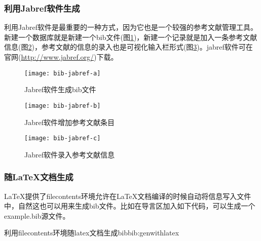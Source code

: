 \documentclass[twoside]{article} %
\begin{document}
\subsubsection{利用Jabref软件生成}
利用Jabref软件是最重要的一种方式，因为它也是一个较强的参考文献管理工具。新建一个数据库就是新建一个bib文件(图\ref{bib:jabref-a})，新建一个记录就是加入一条参考文献信息(图\ref{bib:jabref-b})，参考文献的信息的录入也是可视化输入栏形式(图\ref{bib:jabref-c})。jabref软件可在官网(\url{http://www.jabref.org/})下载。

\begin{figure}[!htb]
  \centering
  \texttt{[image: bib-jabref-a]}
  \caption{Jabref软件生成bib文件}\label{bib:jabref-a}
\end{figure}

\begin{figure}[!htb]
  \centering
  \texttt{[image: bib-jabref-b]}
  \caption{Jabref软件增加参考文献条目}\label{bib:jabref-b}
\end{figure}

\begin{figure}[!htb]
  \centering
  \texttt{[image: bib-jabref-c]}
  \caption{Jabref软件录入参考文献信息}\label{bib:jabref-c}
\end{figure}

\subsubsection{随\LaTeX 文档生成}
\LaTeX 提供了filecontents环境允许在\LaTeX 文档编译的时候自动将信息写入文件中，自然这也可以用来生成bib文件。比如在导言区加入如下代码，可以生成一个example.bib源文件。
\begin{codetex}{利用filecontents环境随latex文档生成bib}{bib:genwithlatex}
\usepackage{filecontents}
\end{codetex}
\end{document}
